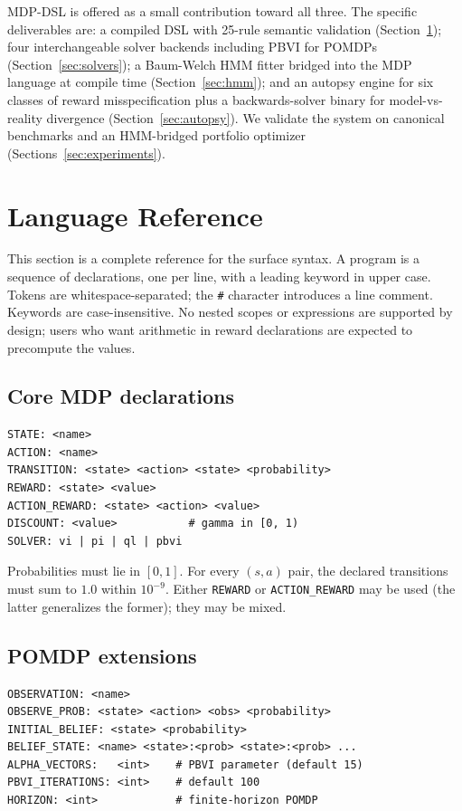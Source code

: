 \documentclass[conference]{IEEEtran}
\begin{document}
MDP-DSL is offered as a small contribution toward all three. The
specific deliverables are: a compiled DSL with 25-rule semantic
validation (Section~\ref{sec:lang}); four interchangeable solver
backends including PBVI for POMDPs (Section~\ref{sec:solvers}); a
Baum-Welch HMM fitter bridged into the MDP language at compile time
(Section~\ref{sec:hmm}); and an autopsy engine for six classes of
reward misspecification plus a backwards-solver binary for
model-vs-reality divergence (Section~\ref{sec:autopsy}). We validate
the system on canonical benchmarks and an HMM-bridged portfolio
optimizer (Sections~\ref{sec:experiments}).

\section{Language Reference}\label{sec:lang}

This section is a complete reference for the surface syntax. A
program is a sequence of declarations, one per line, with a leading
keyword in upper case. Tokens are whitespace-separated; the
\texttt{\#} character introduces a line comment. Keywords are
case-insensitive. No nested scopes or expressions are supported by
design; users who want arithmetic in reward declarations are
expected to precompute the values.

\subsection{Core MDP declarations}

\begin{lstlisting}[style=dsl]
STATE: <name>
ACTION: <name>
TRANSITION: <state> <action> <state> <probability>
REWARD: <state> <value>
ACTION_REWARD: <state> <action> <value>
DISCOUNT: <value>           # gamma in [0, 1)
SOLVER: vi | pi | ql | pbvi
\end{lstlisting}

Probabilities must lie in $[0, 1]$. For every $(s, a)$ pair, the
declared transitions must sum to $1.0$ within $10^{-9}$. Either
\texttt{REWARD} or \texttt{ACTION\_REWARD} may be used (the latter
generalizes the former); they may be mixed.

\subsection{POMDP extensions}

\begin{lstlisting}[style=dsl]
OBSERVATION: <name>
OBSERVE_PROB: <state> <action> <obs> <probability>
INITIAL_BELIEF: <state> <probability>
BELIEF_STATE: <name> <state>:<prob> <state>:<prob> ...
ALPHA_VECTORS:   <int>    # PBVI parameter (default 15)
PBVI_ITERATIONS: <int>    # default 100
HORIZON: <int>            # finite-horizon POMDP
\end{lstlisting}
\end{document}
